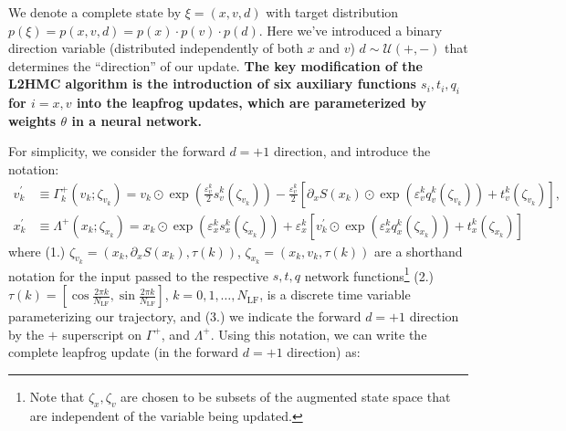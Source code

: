 \documentclass{article} %
\begin{document}
{We denote a complete state by \(\xi = (x, v, d)\) with target distribution \(p(\xi) = p(x, v, d) = p(x)\cdot p(v)\cdot
p(d)\).
%
Here we've introduced a binary direction variable (distributed independently of both \(x\) and \(v\))
\(d\sim\mathcal{U}(+,-)\) that determines the ``direction'' of our update.
%
\textbf{The key modification of the L2HMC algorithm is the introduction of six auxiliary functions \(s_{i}, t_{i}, q_{i}\) for \(i
= x, v\) into the leapfrog updates, which are parameterized by weights \(\theta\) in a neural network.}
%
%

For simplicity, we consider the forward \(d=+1\) direction, and introduce the notation:
%
\begin{align}
   v^{\prime}_{k} &\equiv \Gamma^{+}_{k}(v_{k};\zeta_{v_{k}})
   = v_{k}\odot \exp{\left(\tfrac{\varepsilon^{k}_{v}}{2}s_{v}^{k}(\zeta_{v_{k}})\right)} -
   \tfrac{\varepsilon^{k}_{v}}{2}{\left[\partial_{x}S(x_{k})\odot\exp{\left(\varepsilon^{k}_{v} q_{v}^{k}(\zeta_{v_{k}})\right)}
      +t_{v}^{k}(\zeta_{v_{k}})\right]},\label{eq:new_momentum_update}\\
   x^{\prime}_{k} &\equiv \Lambda^{+}(x_{k};\zeta_{x_{k}})
   = x_{k}\odot\exp(\varepsilon^{k}_{x} s^{k}_{x}(\zeta_{x_{k}}))
   + \varepsilon^{k}_{x}\left[v^{\prime}_{k}\odot\exp(\varepsilon^{k}_{x} q^{k}_{x}(\zeta_{x_{k}}))
         + t^{k}_{x}(\zeta_{x_{k}})\right]\label{eq:new_position_update}
\end{align}
%
where (1.) \(\zeta_{v_{k}} = (x_{k}, \partial_{x}S(x_{k}), \tau(k))\), \(\zeta_{x_{k}} = (x_{k}, v_{k}, \tau(k))\) are a
shorthand notation for the input passed to the respective \(s, t, q\) network functions\footnote{Note that \(\zeta_{x},
\zeta_{v}\) are chosen to be subsets of the augmented state space that are independent of the variable being updated.}
(2.) \(\tau(k) = {\left[\cos\tfrac{2\pi k}{N_{\mathrm{LF}}}, \sin\tfrac{2\pi k}{N_{\mathrm{LF}}}\right]}\), \(k = 0, 1,
\ldots, N_{\mathrm{LF}}\), is a discrete time variable parameterizing our trajectory, and (3.) we indicate the forward
\(d=+1\) direction by the \(+\) superscript on \(\Gamma^{+}\), and \(\Lambda^{+}\).
%
Using this notation, we can write the complete leapfrog update (in the forward \(d=+1\) direction) as:
%
}
\end{document}
